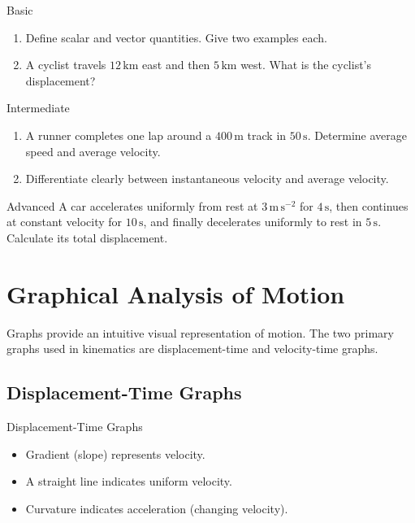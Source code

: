 \FloatBarrier

\begin{tieredquestions}{Basic}
\begin{enumerate}
    \item Define scalar and vector quantities. Give two examples each.
    \item A cyclist travels $12\,\mathrm{km}$ east and then $5\,\mathrm{km}$ west. What is the cyclist's displacement?
\end{enumerate}
\end{tieredquestions}

\begin{tieredquestions}{Intermediate}
\begin{enumerate}
    \item A runner completes one lap around a $400\,\mathrm{m}$ track in $50\,\mathrm{s}$. Determine average speed and average velocity.
    \item Differentiate clearly between instantaneous velocity and average velocity.
\end{enumerate}
\end{tieredquestions}

\begin{tieredquestions}{Advanced}
A car accelerates uniformly from rest at $3\,\mathrm{m\,s^{-2}}$ for $4\,\mathrm{s}$, then continues at constant velocity for $10\,\mathrm{s}$, and finally decelerates uniformly to rest in $5\,\mathrm{s}$. Calculate its total displacement.
\end{tieredquestions}

\FloatBarrier

\section{Graphical Analysis of Motion}
\FloatBarrier

Graphs provide an intuitive visual representation of motion. The two primary graphs used in kinematics are displacement-time and velocity-time graphs.

\subsection{Displacement-Time Graphs}
\FloatBarrier

\begin{keyconcept}{Displacement-Time Graphs}
\begin{itemize}
    \item Gradient (slope) represents velocity.
    \item A straight line indicates uniform velocity.
    \item Curvature indicates acceleration (changing velocity).
\end{itemize}
\end{keyconcept}

